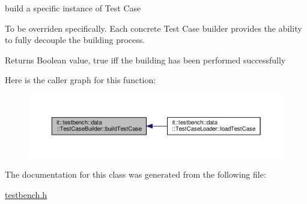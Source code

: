 build a specific instance of Test Case 

To be overriden specifically. Each concrete Test Case builder provides the ability to fully decouple the building process.

\begin{DoxyReturn}{Returns}
Boolean value, true iff the building has been performed successfully 
\end{DoxyReturn}


Here is the caller graph for this function\-:
\nopagebreak
\begin{figure}[H]
\begin{center}
\leavevmode
\includegraphics[width=350pt]{d3/d37/classit_1_1testbench_1_1data_1_1TestCaseBuilder_a5a644d16273c9e8cf580db8558b73a2a_icgraph}
\end{center}
\end{figure}




The documentation for this class was generated from the following file\-:\begin{DoxyCompactItemize}
\item 
\hyperlink{testbench_8h}{testbench.\-h}\end{DoxyCompactItemize}
